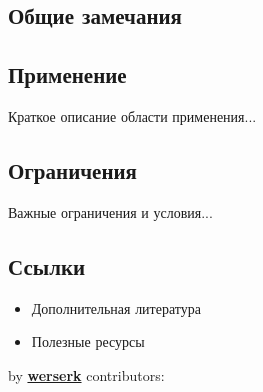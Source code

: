 \documentclass[10pt,landscape,a4paper]{article}
\begin{document}
\begin{multicols}{2}
\section{Общие замечания}

\subsection{Применение}
Краткое описание области применения...

\subsection{Ограничения}
Важные ограничения и условия...

\subsection{Ссылки}
\begin{itemize}
    \item Дополнительная литература
    \item Полезные ресурсы
\end{itemize}

\end{multicols}

{\noindent by \href{https://werserk.com}{\textcolor{accent}{\textbf{werserk}}} \hfill contributors: \texttt{\contributors}}
\end{document}

